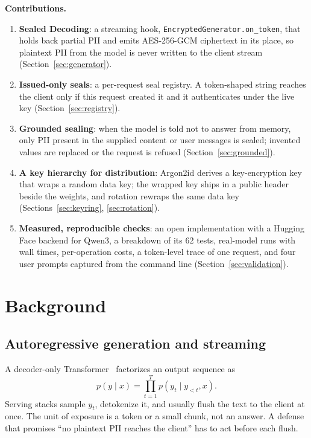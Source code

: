 \documentclass[conference]{IEEEtran}
\newcommand{\code}[1]{\texttt{#1}}
\begin{document}
\textbf{Contributions.}
\begin{enumerate}
  \item \textbf{Sealed Decoding}: a streaming hook, \code{EncryptedGenerator.on\_token}, that holds back partial PII and emits AES-256-GCM ciphertext in its place, so plaintext PII from the model is never written to the client stream (Section~\ref{sec:generator}).
  \item \textbf{Issued-only seals}: a per-request seal registry. A token-shaped string reaches the client only if this request created it and it authenticates under the live key (Section~\ref{sec:registry}).
  \item \textbf{Grounded sealing}: when the model is told not to answer from memory, only PII present in the supplied content or user messages is sealed; invented values are replaced or the request is refused (Section~\ref{sec:grounded}).
  \item \textbf{A key hierarchy for distribution}: Argon2id derives a key-encryption key that wraps a random data key; the wrapped key ships in a public header beside the weights, and rotation rewraps the same data key (Sections~\ref{sec:keyring}, \ref{sec:rotation}).
  \item \textbf{Measured, reproducible checks}: an open implementation with a Hugging Face backend for Qwen3, a breakdown of its 62 tests, real-model runs with wall times, per-operation costs, a token-level trace of one request, and four user prompts captured from the command line (Section~\ref{sec:validation}).
\end{enumerate}

\section{Background}
\label{sec:background}

\subsection{Autoregressive generation and streaming}

A decoder-only Transformer~\cite{vaswani2017attention} factorizes an output sequence as
\begin{equation}
  p(y \mid x) = \prod_{t=1}^{T} p(y_t \mid y_{<t}, x).
  \label{eq:ar}
\end{equation}
Serving stacks sample $y_t$, detokenize it, and usually flush the text to the client at once. The unit of exposure is a token or a small chunk, not an answer. A defense that promises ``no plaintext PII reaches the client'' has to act before each flush.
\end{document}
